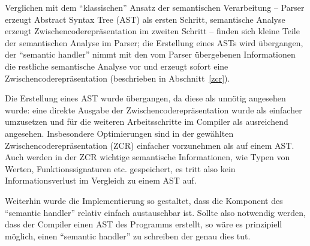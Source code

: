 \documentclass[twoside,a4paper,fleqn,12pt]{book}
\begin{document}

Verglichen mit dem "`klassischen"' Ansatz der semantischen Verarbeitung -- Parser erzeugt Abstract Syntax Tree (AST) als ersten Schritt,
semantische Analyse erzeugt Zwischencoderepräsentation im zweiten Schritt -- finden sich kleine Teile der semantischen
Analyse im Parser; die Erstellung eines ASTs wird übergangen, der ``semantic handler'' nimmt mit den vom
Parser übergebenen Informationen die restliche semantische Analyse vor und erzeugt sofort eine Zwischencoderepräsentation (beschrieben in Abschnitt~\ref{zcr}).

Die Erstellung eines AST wurde übergangen, da diese als unnötig angesehen wurde: eine direkte Ausgabe der Zwischencoderepräsentation
wurde als einfacher umzusetzen und für die weiteren Arbeitsschritte im Compiler als ausreichend angesehen. 
Insbesondere Optimierungen sind in der gewählten Zwischencoderepräsentation (ZCR) einfacher vorzunehmen als auf
einem AST. Auch werden in der ZCR wichtige semantische Informationen, wie Typen von Werten, Funktionssignaturen etc. gespeichert,
es tritt also kein Informationsverlust im Vergleich zu einem AST auf.

Weiterhin wurde die Implementierung so gestaltet, dass die Komponent des ``semantic handler'' relativ einfach austauschbar ist.
Sollte also notwendig werden, dass der Compiler einen AST des Programms erstellt, so wäre es prinzipiell möglich,
einen ``semantic handler'' zu schreiben der genau dies tut.


%   
\end{document}
